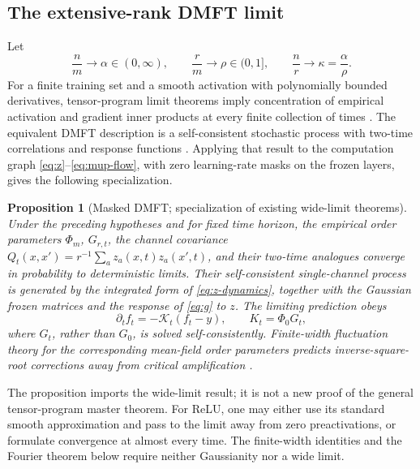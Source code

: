 \documentclass[11pt]{article}
\newcommand{\1}{\mathbf 1}
\theoremstyle{plain}
\newtheorem{proposition}[theorem]{Proposition}
\theoremstyle{definition}
\begin{document}
\subsection{The extensive-rank DMFT limit}

Let
\begin{equation}
 \frac nm\to\alpha\in(0,\infty),\qquad
 \frac rm\to\rho\in(0,1],\qquad
 \frac nr\to\kappa=\frac\alpha\rho.
 \label{eq:ratios}
\end{equation}
For a finite training set and a smooth activation with polynomially bounded
derivatives, tensor-program limit theorems imply concentration of empirical
activation and gradient inner products at every finite collection of times
\citep{yang2021feature}.  The equivalent DMFT description is a
self-consistent stochastic process with two-time correlations and response
functions \citep{bordelon2022dmft}.  Applying that result to the computation
graph \eqref{eq:z}--\eqref{eq:mup-flow}, with zero learning-rate masks on the
frozen layers, gives the following specialization.

\begin{proposition}[Masked DMFT; specialization of existing wide-limit
theorems]
\label{prop:dmft}
Under the preceding hypotheses and for fixed time horizon, the empirical
order parameters \(\Phi_m\), \(G_{r,t}\), the channel covariance
\(Q_t(x,x')=r^{-1}\sum_a z_a(x,t)z_a(x',t)\), and their two-time analogues
converge in probability to deterministic limits.  Their self-consistent
single-channel process is generated by the integrated form of
\eqref{eq:z-dynamics}, together with the Gaussian frozen matrices and the
response of \eqref{eq:g} to \(z\).  The limiting prediction obeys
\begin{equation}
 \partial_tf_t=-\mathcal K_t(f_t-y),\qquad
 K_t=\Phi_0G_t,
 \label{eq:dmft-output}
\end{equation}
where \(G_t\), rather than \(G_0\), is solved self-consistently.  Finite-width
fluctuation theory for the corresponding mean-field order parameters predicts
inverse-square-root corrections away from critical amplification
\citep{bordelon2023finite}.
\end{proposition}

The proposition imports the wide-limit result; it is not a new proof of the
general tensor-program master theorem.  For ReLU, one may either use its
standard smooth approximation and pass to the limit away from zero
preactivations, or formulate convergence at almost every time.  The
finite-width identities and the Fourier theorem below require neither
Gaussianity nor a wide limit.
\end{document}

